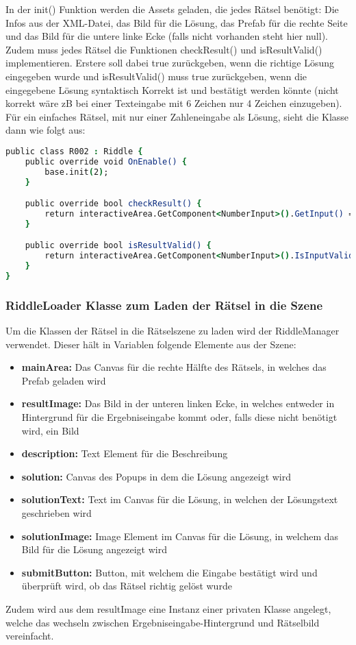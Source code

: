 In der init() Funktion werden die Assets geladen, die jedes Rätsel benötigt: Die Infos aus der XML-Datei, das Bild für die Lösung, das Prefab für die rechte Seite und das Bild für die untere linke Ecke (falls nicht vorhanden steht hier null).\\
Zudem muss jedes Rätsel die Funktionen checkResult() und isResultValid() implementieren. Erstere soll dabei true zurückgeben, wenn die richtige Lösung eingegeben wurde und isResultValid() muss true zurückgeben, wenn die eingegebene Lösung syntaktisch Korrekt ist und bestätigt werden könnte (nicht korrekt wäre zB bei einer Texteingabe mit 6 Zeichen nur 4 Zeichen einzugeben).\\

Für ein einfaches Rätsel, mit nur einer Zahleneingabe als Lösung, sieht die Klasse dann wie folgt aus:
\begin{lstlisting}[language=csh, caption={Klasse für Rätsel 002 die von Riddle.cs erbt}]
public class R002 : Riddle {
    public override void OnEnable() {
        base.init(2);
    }

    public override bool checkResult() {
        return interactiveArea.GetComponent<NumberInput>().GetInput() == 14;
    }

    public override bool isResultValid() {
        return interactiveArea.GetComponent<NumberInput>().IsInputValid();
    }
}
\end{lstlisting}

\subsubsection{RiddleLoader Klasse zum Laden der Rätsel in die Szene}
Um die Klassen der Rätsel in die Rätselszene zu laden wird der RiddleManager verwendet.
Dieser hält in Variablen folgende Elemente aus der Szene:
\begin{itemize}
	\item \textbf{mainArea:} Das Canvas für die rechte Hälfte des Rätsels, in welches das Prefab geladen wird
	\item \textbf{resultImage:} Das Bild in der unteren linken Ecke, in welches entweder in Hintergrund für die Ergebniseingabe kommt oder, falls diese nicht benötigt wird, ein Bild
	\item \textbf{description:} Text Element für die Beschreibung
	\item \textbf{solution:} Canvas des Popups in dem die Lösung angezeigt wird
	\item \textbf{solutionText:} Text im Canvas für die Lösung, in welchen der Lösungstext geschrieben wird
	\item \textbf{solutionImage:} Image Element im Canvas für die Lösung, in welchem das Bild für die Lösung angezeigt wird
	\item \textbf{submitButton:} Button, mit welchem die Eingabe bestätigt wird und überprüft wird, ob das Rätsel richtig gelöst wurde
\end{itemize}
Zudem wird aus dem resultImage eine Instanz einer privaten Klasse angelegt, welche das wechseln zwischen Ergebniseingabe-Hintergrund und Rätselbild vereinfacht.\\


